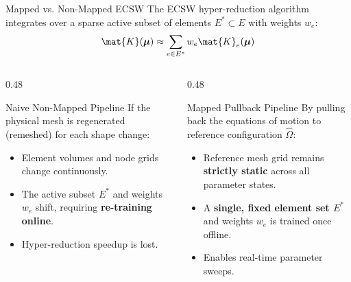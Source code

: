 \begin{frame}{Mapped vs. Non-Mapped ECSW}
  \small
  The ECSW hyper-reduction algorithm integrates over a sparse active subset of elements $E^* \subset E$ with weights $w_e$:
  \[
    \mat{K}(\boldsymbol{\mu}) \approx \sum_{e \in E^*} w_e \mat{K}_e(\boldsymbol{\mu})
  \]
  \vspace{-0.15cm}
  \begin{columns}[T]
    \begin{column}{0.48\textwidth}
      \begin{alertblock}{Naive Non-Mapped Pipeline}
        \footnotesize
        If the physical mesh is regenerated (remeshed) for each shape change:
        \begin{itemize}
          \setlength{\itemsep}{1pt}
          \item Element volumes and node grids change continuously.
          \item The active subset $E^*$ and weights $w_e$ shift, requiring \textbf{re-training online}.
          \item Hyper-reduction speedup is lost.
        \end{itemize}
      \end{alertblock}
    \end{column}
    \begin{column}{0.48\textwidth}
      \begin{exampleblock}{Mapped Pullback Pipeline}
        \footnotesize
        By pulling back the equations of motion to reference configuration $\hat{\Omega}$:
        \begin{itemize}
          \setlength{\itemsep}{1pt}
          \item Reference mesh grid remains \textbf{strictly static} across all parameter states.
          \item A \textbf{single, fixed element set $E^*$} and weights $w_e$ is trained once offline.
          \item Enables real-time parameter sweeps.
        \end{itemize}
      \end{exampleblock}
    \end{column}
  \end{columns}
\end{frame}

